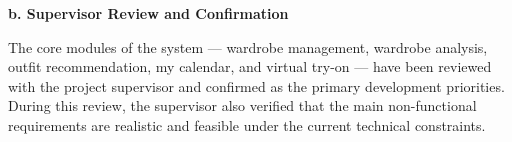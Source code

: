 \textbf{\large b. Supervisor Review and Confirmation}

The core modules of the system --- wardrobe management, wardrobe analysis, outfit recommendation, my calendar, and virtual try-on --- have been reviewed with the project supervisor and confirmed as the primary development priorities. During this review, the supervisor also verified that the main non-functional requirements are realistic and feasible under the current technical constraints.
    